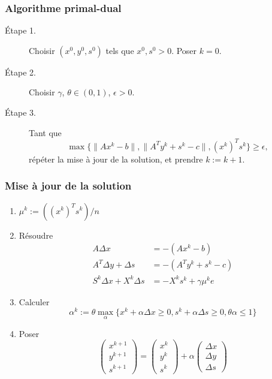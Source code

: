 \documentclass[usepdftitle=false,aspectratio=169]{beamer}
\begin{document}
\begin{frame}
\frametitle{Algorithme primal-dual}

\begin{description}
\item[Étape 1.]
Choisir $(x^0, y^0, s^0)$ tels que $x^0, s^0 > 0$. Poser $k = 0$.
\item[Étape 2.]
Choisir $\gamma$, $\theta \in (0,1)$, $\epsilon > 0$.
\item[Étape 3.]
Tant que
$$
\max \{ \| Ax^k - b \|, \| A^Ty^k + s^k - c \|, (x^k)^Ts^k \} \geq \epsilon,
$$
répéter la mise à jour de la solution, et prendre $k := k+1$.
\end{description}

\end{frame}

\begin{frame}
\frametitle{Mise à jour de la solution}

\begin{enumerate}
	\item $\mu^k := ((x^k)^Ts^k)/n$
	\item Résoudre
	\begin{align*}
	A\Delta x & = -(Ax^k-b) \\
	A^T\Delta y + \Delta s &= -(A^Ty^k+s^k-c) \\
	S^k \Delta x +X^k\Delta s &= -X^ks^k + \gamma \mu^k e
	\end{align*}
	\item
	Calculer
	$$
	\alpha^k := \theta \max_{\alpha} \{ x^k+\alpha \Delta x \geq 0 , s^k + \alpha \Delta s \geq 0, \theta \alpha \leq 1 \}
	$$
	\item Poser
$$
\begin{pmatrix} x^{k+1} \\ y^{k+1} \\ s^{k+1} \end{pmatrix}
=
\begin{pmatrix} x^k \\ y^k \\ s^k \end{pmatrix}
+\alpha
\begin{pmatrix}
\Delta x \\ \Delta y \\ \Delta s
\end{pmatrix}
$$
	\end{enumerate}

\end{frame}
\end{document}
